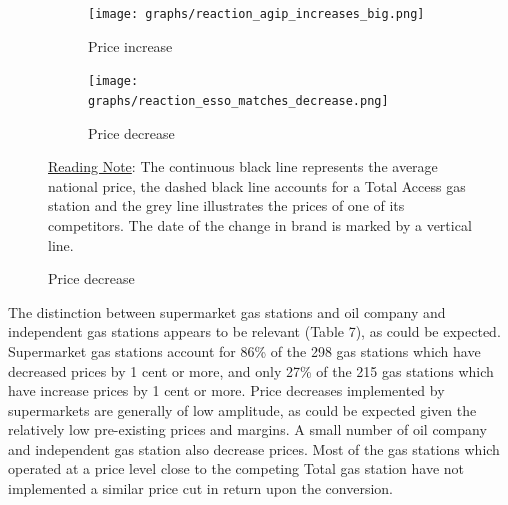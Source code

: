 \documentclass[english]{article}
\begin{document}
\begin{figure}[htb!]
\centering
\caption{Examples of price series of Total Access competitors}
\label{fig:price_reaction_examples}
\begin{subfigure}[b]{\textwidth}
\centering
\texttt{[image: graphs/reaction\_agip\_increases\_big.png]}
\caption[short]{Price increase}
\end{subfigure}
\begin{subfigure}[b]{\textwidth}
\centering
\texttt{[image: graphs/reaction\_esso\_matches\_decrease.png]}
\caption[short]{Price decrease}
\end{subfigure}
\flushleft
{\small{}\uline{Reading Note}}{\small{}: } The continuous black line represents the average national price, the dashed black line accounts for a Total Access gas station and the grey line illustrates the prices of one of its competitors. The date of the change in brand is marked by a vertical line.
\end{figure}

The distinction between supermarket gas stations and oil company and independent gas stations appears to be relevant (Table 7), as could be expected. Supermarket gas stations account for 86\% of the 298 gas stations which have decreased prices by 1 cent or more, and only 27\% of the 215 gas stations which have increase prices by 1 cent or more. Price decreases implemented by supermarkets are generally of low amplitude, as could be expected given the relatively low pre-existing prices and margins. A small number of oil company and independent gas station also decrease prices. Most of the gas stations which operated at a price level close to the competing Total gas station have not implemented a similar price cut in return upon
the conversion.
\end{document}
